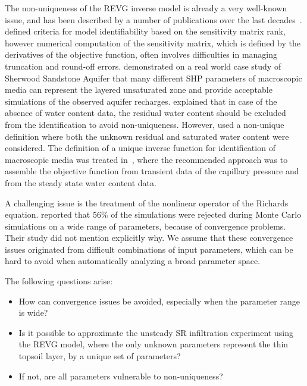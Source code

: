 \documentclass[review,times,3p,10pt]{elsarticle}
\begin{document}
The non-uniqueness of the REVG inverse model is already a very well-known issue, and has been described by a number of publications over the last decades~\citep{kool1985, mous1993, ihlwang2003, beven2003-uncertain,Kowalsky04,Nakhaei, Kamali,pena17}.
\cite{mous1993} defined criteria for model identifiability based on the sensitivity matrix rank, however numerical computation of the sensitivity matrix, which is defined by the derivatives of the objective function, often involves difficulties in managing truncation and round-off errors.
\cite{beven2003-uncertain} demonstrated on a real world case study of Sherwood Sandstone Aquifer that many different SHP parameters of macroscopic media can represent the layered unsaturated zone and provide acceptable simulations of the observed aquifer recharges.  \cite{mous1993} explained that in case of the absence of water content data, the residual water content should be excluded from the identification to avoid non-uniqueness. However, \cite{beven2003-uncertain} used
a non-unique definition where both the unknown residual and saturated water content were considered.
The definition of a unique inverse function for identification of macroscopic media was treated in~\citep{zou200126}, where the recommended approach was to assemble the objective function from transient data of the capillary pressure and from the steady state water content data. 

A challenging issue is the treatment of the nonlinear operator of the Richards equation. \cite{beven2003-uncertain} reported that 56\% of the simulations were rejected during Monte Carlo simulations on a wide range of parameters, because of convergence problems. 
Their study did not mention explicitly why. { We assume that these convergence issues originated from 
 difficult combinations of input parameters, which can be hard to avoid when automatically analyzing a broad parameter space. }


The following questions arise: 
\begin{itemize}
\item How can convergence issues be avoided, especially when the parameter range is wide? 
\item Is it possible to approximate the unsteady SR infiltration experiment using the REVG model, where the only unknown parameters represent the thin topsoil layer, by a unique set of parameters? 
\item If not, are all parameters vulnerable to non-uniqueness?
\end{itemize}
\end{document}
